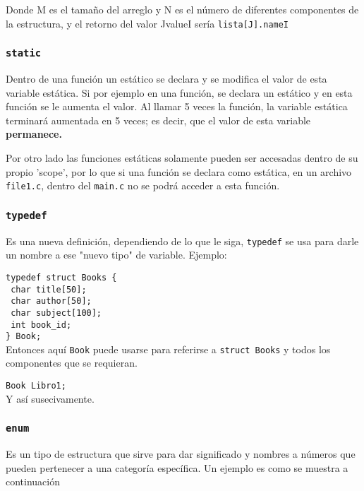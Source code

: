 Donde M es el tamaño del arreglo y N es el número de diferentes componentes de la estructura, y el retorno del valor JvalueI sería \texttt{lista[J].nameI}

\subsubsection{\texttt{static}}

Dentro de una función un estático se declara y se modifica el valor de esta variable estática. Si por ejemplo en una función, se declara un estático y en esta función se le aumenta el valor. Al llamar 5 veces la función, la variable estática terminará aumentada en 5 veces; es decir, que el valor de esta variable \textbf{permanece.}

Por otro lado las funciones estáticas solamente pueden ser accesadas dentro de su propio 'scope', por lo que si una función se declara como estática, en un archivo \texttt{file1.c}, dentro del \texttt{main.c} no se podrá acceder a esta función.

\subsubsection{\texttt{typedef}}

Es una nueva definición, dependiendo de lo que le siga, \texttt{typedef} se usa para darle un nombre a ese "nuevo tipo" de variable. Ejemplo:

\texttt{typedef struct Books \{} \\
\texttt{    char title[50];} \\
\texttt{   char author[50];} \\
\texttt{   char subject[100];} \\
\texttt{   int book\_id;} \\
\texttt{\} Book;} \\

Entonces aquí \texttt{Book} puede usarse para referirse a \texttt{struct Books} y todos los componentes que se requieran.

\texttt{Book Libro1;} \\ 
Y así susecivamente.

\subsubsection{\texttt{enum}}

Es un tipo de estructura que sirve para dar significado y nombres a números que pueden pertenecer a una categoría específica. Un ejemplo es como se muestra a continuación

